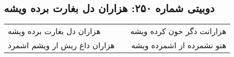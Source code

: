 \begin{center}
\section*{دوبیتی شماره ۲۵۰: هزاران دل بغارت برده ویشه}
\label{sec:250}
\begin{longtable}{l p{0.5cm} r}
هزاران دل بغارت برده ویشه
&&
هزارانت دگر خون کرده ویشه
\\
هزاران داغ ریش ار ویشم اشمرد
&&
هنو نشمرده از اشمرده ویشه
\\
\end{longtable}
\end{center}
